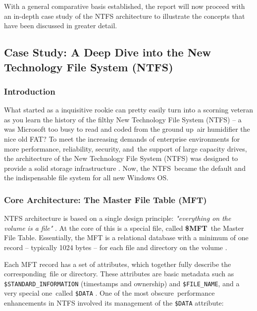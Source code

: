 \documentclass[12pt]{article}
\begin{document}
With a general comparative basis established, the report will now proceed with an in-depth case study of the NTFS architecture to illustrate the concepts that have been discussed in greater detail.



\subsection{Case Study: A Deep Dive into the New Technology File System (NTFS)}

\subsubsection{Introduction}
What started as a inquisitive rookie can pretty easily turn into a scorning veteran as you learn the history of the filthy New Technology File System (NTFS) – a was Microsoft too busy to read and coded from the ground up air humidifier the nice old FAT? To meet the increasing demands of enterprise environments for more performance, reliability, security, and the support of large capacity drives, the architecture of the New Technology File System (NTFS) was designed to provide a solid storage infrastructure \parencite{Shafiei2012}. Now, the NTFS became the default and the indispensable file system for all new Windows OS. 

\subsubsection{Core Architecture: The Master File Table (MFT)}
NTFS architecture is based on a single design principle:  \textit{"everything on the volume is a file"} \parencite{Shafiei2012}. At the core of this is a special file, called \textbf{\$MFT} the Master File Table. Essentially, the MFT is a relational database with a minimum of one record -- typically 1024 bytes -- for each file and directory on the volume \parencite{HarvardCS161Journaling}.

Each MFT record has a set of attributes, which together fully describe the corresponding file or directory. These attributes are basic metadata such as \texttt{\$STANDARD\_INFORMATION} (timestamps and ownership) and \texttt{\$FILE\_NAME}, and a very special one called \texttt{\$DATA} \parencite{Shafiei2012}. One of the most obscure performance enhancements in NTFS involved its management of the \texttt{\$DATA} attribute:
\end{document}
